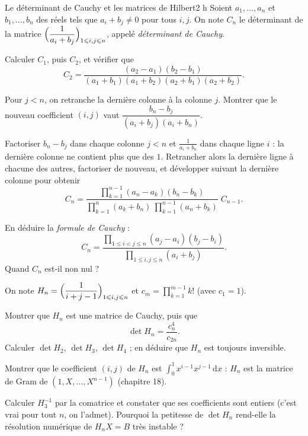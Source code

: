 

\begin{defi}{Le déterminant de Cauchy et les matrices de Hilbert}{2 h}
Soient $a_1,\dots,a_n$ et $b_1,\dots,b_n$ des réels tels que
$a_i+b_j\neq0$ pour tous $i,j$. On note $C_n$ le déterminant de la matrice
$\Bigl(\dfrac{1}{a_i+b_j}\Bigr)_{1\leqslant i,j\leqslant n}$, appelé
\emph{déterminant de Cauchy}.

\begin{questions}
  \item Calculer $C_1$, puis $C_2$, et vérifier que
    \[
    C_2=\frac{(a_2-a_1)(b_2-b_1)}{(a_1+b_1)(a_1+b_2)(a_2+b_1)(a_2+b_2)} .
    \]
\end{questions}

\begin{questions}[resume]
  \item Pour $j<n$, on retranche la dernière colonne à la colonne $j$.
    Montrer que le nouveau coefficient $(i,j)$ vaut
    $\dfrac{b_n-b_j}{(a_i+b_j)(a_i+b_n)}$.
  \item Factoriser $b_n-b_j$ dans chaque colonne $j<n$ et
    $\frac{1}{a_i+b_n}$ dans chaque ligne $i$ : la dernière colonne ne
    contient plus que des $1$. Retrancher alors la dernière ligne à chacune
    des autres, factoriser de nouveau, et développer suivant la dernière
    colonne pour obtenir
    \[
    C_n=\frac{\prod_{k=1}^{n-1}(a_n-a_k)(b_n-b_k)}
    {\prod_{k=1}^{n}(a_k+b_n)\ \prod_{k=1}^{n-1}(a_n+b_k)}\;C_{n-1} .
    \]
  \item En déduire la \emph{formule de Cauchy} :
    \[
    C_n=\frac{\prod_{1\leqslant i<j\leqslant n}(a_j-a_i)(b_j-b_i)}
    {\prod_{1\leqslant i,j\leqslant n}(a_i+b_j)} .
    \]
    Quand $C_n$ est-il non nul ?
\end{questions}

On note $H_n=\Bigl(\dfrac{1}{i+j-1}\Bigr)_{1\leqslant i,j\leqslant n}$ et
$c_m=\prod_{k=1}^{m-1}k!$ (avec $c_1=1$).
\begin{questions}[resume]
  \item Montrer que $H_n$ est une matrice de Cauchy, puis que
    \[
    \det H_n=\frac{c_n^{4}}{c_{2n}} .
    \]
    Calculer $\det H_2$, $\det H_3$, $\det H_4$ ; en déduire que $H_n$ est
    toujours inversible.
  \item Montrer que le coefficient $(i,j)$ de $H_n$ est
    $\int_0^1x^{i-1}x^{j-1}\,\mathrm{d}x$ : $H_n$ est la matrice de Gram de
    $(1,X,\dots,X^{n-1})$ (chapitre 18).
  \item Calculer $H_3^{-1}$ par la comatrice et constater que ses
    coefficients sont entiers (c'est vrai pour tout $n$, on l'admet).
    Pourquoi la petitesse de $\det H_n$ rend-elle la résolution numérique
    de $H_nX=B$ très instable ?
\end{questions}


\end{defi}
